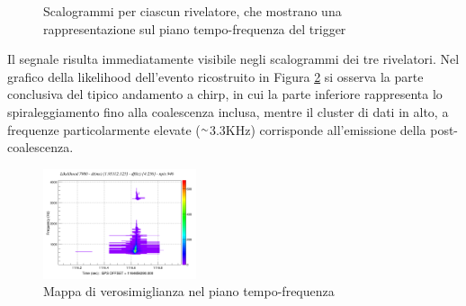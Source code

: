 \begin{figure}[hbt!]
	\centering
	\caption{Scalogrammi per ciascun rivelatore, che mostrano una rappresentazione sul piano tempo-frequenza del trigger}
	\label{fig:spettrogramma_apr4}
\end{figure}
Il segnale risulta immediatamente visibile negli scalogrammi dei tre rivelatori.
Nel grafico della likelihood dell'evento ricostruito in Figura \ref{fig:Likelihood_APR4} si osserva la parte conclusiva del tipico andamento a chirp, in cui la parte inferiore rappresenta lo spiraleggiamento fino alla coalescenza inclusa, mentre il cluster di dati in alto, a frequenze particolarmente elevate ($\smallsim$3.3KHz) corrisponde all'emissione della post-coalescenza.
\begin{figure}
	\vspace{-20pt}
	\begin{center}
		\includegraphics[width=0.4\textwidth]{figures/Capitolo_3/APR4_q09/l_tfmap_scalogram.png}
	\end{center}
	\caption{Mappa di verosimiglianza nel piano tempo-frequenza}
	\label{fig:Likelihood_APR4}
	\vspace{-20pt}
\end{figure}
